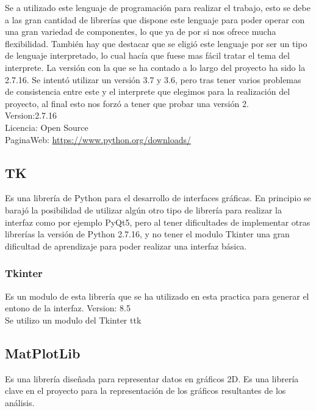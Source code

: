 Se a utilizado este lenguaje de programación para realizar el trabajo, esto se debe a las gran cantidad de librerías que dispone este lenguaje para poder operar con una gran variedad de componentes, lo que ya de por si nos ofrece mucha flexibilidad. También hay que destacar que se eligió este lenguaje por ser un tipo de lenguaje interpretado, lo cual hacía que fuese mas fácil tratar el tema del interprete.
La versión con la que se ha contado a lo largo del proyecto ha sido la 2.7.16. Se intentó utilizar un versión 3.7 y 3.6, pero tras tener varios problemas de consistencia entre este y el interprete que elegimos para la realización del proyecto, al final esto nos forzó a tener que probar una versión 2.\\

Version:2.7.16\\
Licencia: Open Source\\
PaginaWeb: \url{https://www.python.org/downloads/}\\

\subsection{TK}

Es una librería de Python para el desarrollo de interfaces gráficas. En principio se barajó la posibilidad de utilizar algún otro tipo de librería para realizar la interfaz como por ejemplo PyQt5, pero al tener dificultades de implementar otras librerías la versión de Python 2.7.16, y no tener el modulo Tkinter\cite{Tkinter} una gran dificultad de aprendizaje para poder realizar una interfaz básica.



\subsubsection{Tkinter}
Es un modulo de esta librería que se ha utilizado en esta practica para generar el entono de la interfaz.
Version: 8.5 \\

Se utilizo un modulo del Tkinter ttk\cite{ttk}

\subsection{MatPlotLib}

Es una librería diseñada para representar datos en gráficos 2D. Es una librería clave en el proyecto para la representación de los gráficos resultantes de los análisis.\\

